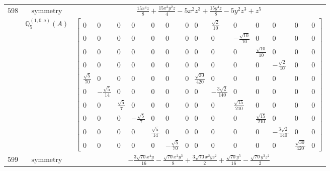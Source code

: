 \documentclass[fleqn,8pt,landscape]{jsarticle}
\begin{document}
\begin{longtable}{ccc}
$ 598 $ & $ \text{symmetry} $ & $ \frac{15 x^{4} z}{8} + \frac{15 x^{2} y^{2} z}{4} - 5 x^{2} z^{3} + \frac{15 y^{4} z}{8} - 5 y^{2} z^{3} + z^{5} $ \\
$  $ & $ \mathbb{Q}_{5}^{(1,0;a)}(A) $ & $ \begin{bmatrix} 0 & 0 & 0 & 0 & 0 & 0 & 0 & 0 & \frac{\sqrt{2}}{10} & 0 & 0 & 0 & 0 & 0 \\ 0 & 0 & 0 & 0 & 0 & 0 & 0 & 0 & 0 & - \frac{\sqrt{10}}{10} & 0 & 0 & 0 & 0 \\ 0 & 0 & 0 & 0 & 0 & 0 & 0 & 0 & 0 & 0 & \frac{\sqrt{10}}{10} & 0 & 0 & 0 \\ 0 & 0 & 0 & 0 & 0 & 0 & 0 & 0 & 0 & 0 & 0 & - \frac{\sqrt{2}}{10} & 0 & 0 \\ \frac{\sqrt{5}}{70} & 0 & 0 & 0 & 0 & 0 & 0 & \frac{\sqrt{30}}{420} & 0 & 0 & 0 & 0 & 0 & 0 \\ 0 & - \frac{\sqrt{5}}{14} & 0 & 0 & 0 & 0 & 0 & 0 & - \frac{3 \sqrt{2}}{140} & 0 & 0 & 0 & 0 & 0 \\ 0 & 0 & \frac{\sqrt{5}}{7} & 0 & 0 & 0 & 0 & 0 & 0 & \frac{\sqrt{15}}{210} & 0 & 0 & 0 & 0 \\ 0 & 0 & 0 & - \frac{\sqrt{5}}{7} & 0 & 0 & 0 & 0 & 0 & 0 & \frac{\sqrt{15}}{210} & 0 & 0 & 0 \\ 0 & 0 & 0 & 0 & \frac{\sqrt{5}}{14} & 0 & 0 & 0 & 0 & 0 & 0 & - \frac{3 \sqrt{2}}{140} & 0 & 0 \\ 0 & 0 & 0 & 0 & 0 & - \frac{\sqrt{5}}{70} & 0 & 0 & 0 & 0 & 0 & 0 & \frac{\sqrt{30}}{420} & 0 \end{bmatrix} $ \\ \hline
$ 599 $ & $ \text{symmetry} $ & $ - \frac{3 \sqrt{70} x^{4} y}{16} - \frac{\sqrt{70} x^{2} y^{3}}{8} + \frac{3 \sqrt{70} x^{2} y z^{2}}{2} + \frac{\sqrt{70} y^{5}}{16} - \frac{\sqrt{70} y^{3} z^{2}}{2} $ \\

\end{longtable}
\end{document}
